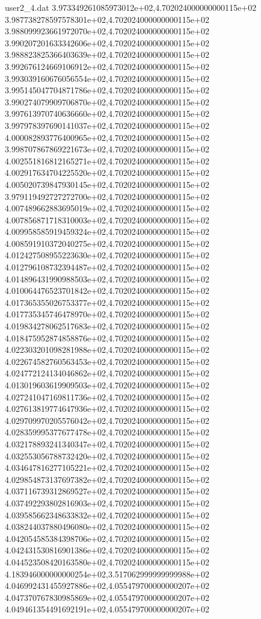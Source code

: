 \begin{filecontents}{user2_4.dat}
3.973349261085973012e+02,4.702024000000000115e+02
3.987738278597578301e+02,4.702024000000000115e+02
3.988099923661972070e+02,4.702024000000000115e+02
3.990207201633342606e+02,4.702024000000000115e+02
3.988823825366403639e+02,4.702024000000000115e+02
3.992676124669106912e+02,4.702024000000000115e+02
3.993039160676056554e+02,4.702024000000000115e+02
3.995145047704871786e+02,4.702024000000000115e+02
3.990274079909706870e+02,4.702024000000000115e+02
3.997613970740636660e+02,4.702024000000000115e+02
3.997978397690141037e+02,4.702024000000000115e+02
4.000082893776400965e+02,4.702024000000000115e+02
3.998707867869221673e+02,4.702024000000000115e+02
4.002551816812165271e+02,4.702024000000000115e+02
4.002917634704225520e+02,4.702024000000000115e+02
4.005020739847930145e+02,4.702024000000000115e+02
3.979119492727272700e+02,4.702024000000000115e+02
4.007489662883695019e+02,4.702024000000000115e+02
4.007856871718310003e+02,4.702024000000000115e+02
4.009958585919459324e+02,4.702024000000000115e+02
4.008591910372040275e+02,4.702024000000000115e+02
4.012427508955223630e+02,4.702024000000000115e+02
4.012796108732394487e+02,4.702024000000000115e+02
4.014896431990988503e+02,4.702024000000000115e+02
4.010064476523701842e+02,4.702024000000000115e+02
4.017365355026753377e+02,4.702024000000000115e+02
4.017735345746478970e+02,4.702024000000000115e+02
4.019834278062517683e+02,4.702024000000000115e+02
4.018475952874858876e+02,4.702024000000000115e+02
4.022303201098281988e+02,4.702024000000000115e+02
4.022674582760563453e+02,4.702024000000000115e+02
4.024772124134046862e+02,4.702024000000000115e+02
4.013019603619909503e+02,4.702024000000000115e+02
4.027241047169811736e+02,4.702024000000000115e+02
4.027613819774647936e+02,4.702024000000000115e+02
4.029709970205576042e+02,4.702024000000000115e+02
4.028359995377677478e+02,4.702024000000000115e+02
4.032178893241340347e+02,4.702024000000000115e+02
4.032553056788732420e+02,4.702024000000000115e+02
4.034647816277105221e+02,4.702024000000000115e+02
4.029854873137697382e+02,4.702024000000000115e+02
4.037116739312869527e+02,4.702024000000000115e+02
4.037492293802816903e+02,4.702024000000000115e+02
4.039585662348633832e+02,4.702024000000000115e+02
4.038244037880496080e+02,4.702024000000000115e+02
4.042054585384398706e+02,4.702024000000000115e+02
4.042431530816901386e+02,4.702024000000000115e+02
4.044523508420163580e+02,4.702024000000000115e+02
4.183946000000000254e+02,3.517062999999999988e+02
4.046992431455927886e+02,4.055479700000000207e+02
4.047370767830985869e+02,4.055479700000000207e+02
4.049461354491692191e+02,4.055479700000000207e+02

\end{filecontents}
